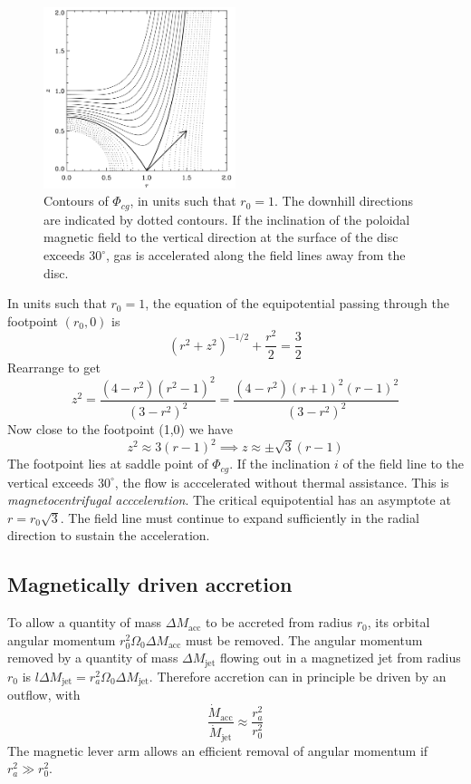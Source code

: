\documentclass{jknotes}
\begin{document}
\begin{figure}[h]
	\centering
	\includegraphics[width=0.5\textwidth]{outflow.png}
	\caption{Contours of $\Phi_{cg}$, in units such that $r_0 = 1$. The
		downhill directions are indicated by dotted contours. If the
		inclination of the poloidal magnetic field to the vertical direction
		at the surface of the disc exceeds $30^{\circ}$, gas is accelerated
	along the field lines away from the disc.}
\end{figure}

In units such that $r_0 =1$, the equation of the equipotential passing through
the footpoint $(r_0,0)$ is
\begin{equation}
	(r^2 + z^2)^{-1/2} + \frac{r^2}{2} = \frac{3}{2}
\end{equation}
Rearrange to get
\begin{equation}
	z^2 = \frac{(4-r^2)(r^2-1)^2}{(3-r^2)^2} =
	\frac{(4-r^2)(r+1)^2(r-1)^2}{(3-r^2)^2}
\end{equation}
Now close to the footpoint (1,0) we have
\begin{equation}
	z^2 \approx 3(r-1)^2 \implies z \approx \pm \sqrt{3}(r-1)
\end{equation}
The footpoint lies at saddle point of $\Phi_{cg}$. If the inclination $i$ of
the field line to the vertical exceeds $30^{\circ}$, the flow is acccelerated
without thermal assistance. This is \emph{magnetocentrifugal accceleration}.
The critical equipotential has an asymptote at $r=r_0\sqrt{3}$. The field line
must continue to expand sufficiently in the radial direction to sustain the
acceleration.

\subsection{Magnetically driven accretion}
To allow a quantity of mass $\Delta M_{\text{acc}}$ to be accreted from radius
$r_0$, its orbital angular momentum $r_0^2 \Omega_0 \Delta M_{\text{acc}}$
must be removed. The angular momentum removed by a quantity of mass $\Delta
M_{\text{jet}}$ flowing out in a magnetized jet from radius $r_0$ is
$l\Delta M_{\text{jet}} = r_a^2 \Omega_0 \Delta M_{\text{jet}}$. Therefore
accretion can in principle be driven by an outflow, with
\begin{equation}
	\frac{\dot{M}_{\text{acc}}}{\dot{M}_{\text{jet}}} \approx
	\frac{r_a^2}{r_0^2}
\end{equation}
The magnetic lever arm allows an efficient removal of angular momentum if
$r_a^2 \gg r_0^2$. 
\end{document}
